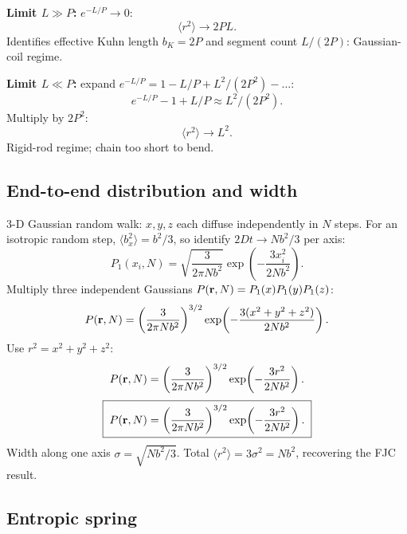 \documentclass[11pt]{article}
\begin{document}
\textbf{Limit $L\gg P$:} $e^{-L/P}\to 0$:
\[ \langle r^{2}\rangle\to 2PL. \]
Identifies effective Kuhn length $b_K=2P$ and segment count $L/(2P)$: Gaussian-coil regime.

\textbf{Limit $L\ll P$:} expand $e^{-L/P}=1-L/P+L^{2}/(2P^{2})-\dots$:
\[ e^{-L/P}-1+L/P\approx L^{2}/(2P^{2}). \]
Multiply by $2P^{2}$:
\[ \langle r^{2}\rangle\to L^{2}. \]
Rigid-rod regime; chain too short to bend.

\subsection*{End-to-end distribution and width}

3-D Gaussian random walk: $x,y,z$ each diffuse independently in $N$ steps. For an isotropic random step, $\langle b_x^{2}\rangle=b^{2}/3$, so identify $2Dt\to Nb^{2}/3$ per axis:
\[ P_1(x_i,N)=\sqrt{\frac{3}{2\pi Nb^{2}}}\exp\!\left(-\frac{3x_i^{2}}{2Nb^{2}}\right). \]
Multiply three independent Gaussians $P(\vb r,N)=P_1(x)P_1(y)P_1(z)$:
\[ P(\vb r,N)=\left(\frac{3}{2\pi Nb^{2}}\right)^{3/2}\exp\!\left(-\frac{3(x^{2}+y^{2}+z^{2})}{2Nb^{2}}\right). \]
Use $r^{2}=x^{2}+y^{2}+z^{2}$:
\[ P(\vb r,N)=\left(\frac{3}{2\pi Nb^{2}}\right)^{3/2}\exp\!\left(-\frac{3r^{2}}{2Nb^{2}}\right). \]
\[ \boxed{\;P(\vb r,N)=\left(\frac{3}{2\pi Nb^{2}}\right)^{3/2}\exp\!\left(-\frac{3r^{2}}{2Nb^{2}}\right).\;} \]
Width along one axis $\sigma=\sqrt{Nb^{2}/3}$. Total $\langle r^{2}\rangle=3\sigma^{2}=Nb^{2}$, recovering the FJC result.

\begin{center}
\end{center}

\subsection*{Entropic spring}
\end{document}
